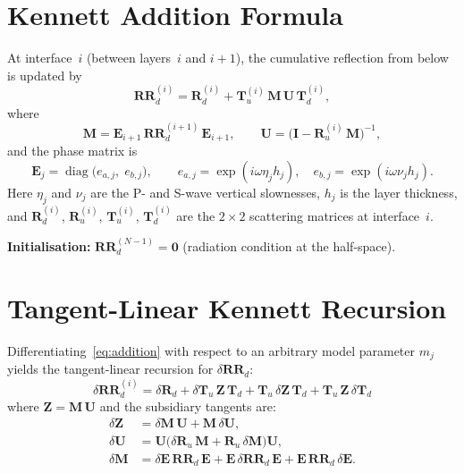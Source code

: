 \documentclass[11pt,a4paper]{article}
\newcommand{\dR}{\delta\mathbf{R}}
\newcommand{\dT}{\delta\mathbf{T}}
\newcommand{\dE}{\delta\mathbf{E}}
\newcommand{\dM}{\delta\mathbf{M}}
\newcommand{\dU}{\delta\mathbf{U}}
\newcommand{\dZ}{\delta\mathbf{Z}}
\newcommand{\dRR}{\delta\mathbf{RR}}
\newcommand{\RR}{\mathbf{RR}}
\newcommand{\Rd}{\mathbf{R}_d}
\newcommand{\Ru}{\mathbf{R}_u}
\newcommand{\Tu}{\mathbf{T}_u}
\newcommand{\Td}{\mathbf{T}_d}
\newcommand{\vE}{\mathbf{E}}
\newcommand{\vM}{\mathbf{M}}
\newcommand{\vU}{\mathbf{U}}
\newcommand{\vZ}{\mathbf{Z}}
\newcommand{\vI}{\mathbf{I}}
\theoremstyle{plain}
\theoremstyle{remark}
\begin{document}
\section{Kennett Addition Formula}\label{sec:addition}

At interface~$i$ (between layers~$i$ and $i{+}1$), the cumulative reflection
from below is updated by
\begin{equation}\label{eq:addition}
  \RR_d^{(i)}
  = \Rd^{(i)} + \Tu^{(i)}\,\vM\,\vU\,\Td^{(i)},
\end{equation}
where
\begin{equation}\label{eq:MU}
  \vM = \vE_{i+1}\,\RR_d^{(i+1)}\,\vE_{i+1},
  \qquad
  \vU = \bigl(\vI - \Ru^{(i)}\,\vM\bigr)^{-1},
\end{equation}
and the phase matrix is
\begin{equation}\label{eq:E}
  \vE_j = \operatorname{diag}\bigl(e_{a,j},\; e_{b,j}\bigr),
  \qquad
  e_{a,j} = \exp(i\omega\eta_j h_j),
  \quad
  e_{b,j} = \exp(i\omega\nu_j h_j).
\end{equation}
Here $\eta_j$ and $\nu_j$ are the P- and S-wave vertical slownesses,
$h_j$ is the layer thickness, and $\Rd^{(i)}$, $\Ru^{(i)}$, $\Tu^{(i)}$,
$\Td^{(i)}$ are the $2\times 2$ scattering matrices at interface~$i$.

\medskip\noindent
\textbf{Initialisation:}
$\RR_d^{(N-1)} = \mathbf{0}$ (radiation condition at the half-space).

\section{Tangent-Linear Kennett Recursion}\label{sec:tangent}

Differentiating~\eqref{eq:addition} with respect to an arbitrary model
parameter $m_j$ yields the tangent-linear recursion for $\dRR_d$:
\begin{equation}\label{eq:tl-main}
  \boxed{
  \dRR_d^{(i)}
  = \dR_d
  + \dT_u\,\vZ\,\Td
  + \Tu\,\dZ\,\Td
  + \Tu\,\vZ\,\dT_d
  }
\end{equation}
where $\vZ = \vM\,\vU$ and the subsidiary tangents are:
\begin{align}
  \dZ   &= \dM\,\vU + \vM\,\dU, \label{eq:dZ}\\[4pt]
  \dU   &= \vU\bigl(\dR_u\,\vM + \Ru\,\dM\bigr)\vU,
           \label{eq:dU}\\[4pt]
  \dM   &= \dE\,\RR_d\,\vE
         + \vE\,\dRR_d\,\vE
         + \vE\,\RR_d\,\dE.
           \label{eq:dM}
\end{align}
\end{document}
